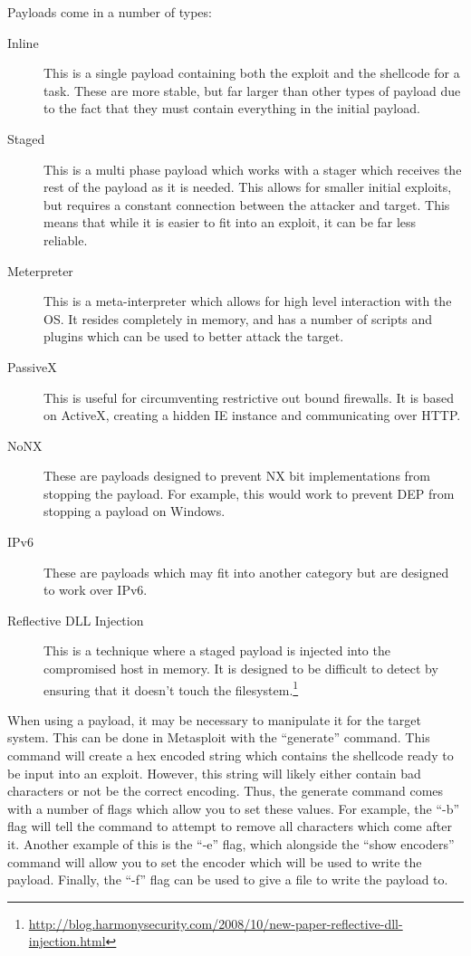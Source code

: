 \documentclass[a4paper,11pt]{report}
\begin{document}
				Payloads come in a number of types:
				\begin{description}
					\item[Inline]
						This is a single payload containing both the exploit and the shellcode for a task. 
						These are more stable, but far larger than other types of payload due to the fact that they must contain everything in the initial payload. 
					\item[Staged]
						This is a multi phase payload which works with a stager which receives the rest of the payload as it is needed. 
						This allows for smaller initial exploits, but requires a constant connection between the attacker and target. 
						This means that while it is easier to fit into an exploit, it can be far less reliable. 
					\item[Meterpreter]
						This is a meta-interpreter which allows for high level interaction with the OS. 
						It resides completely in memory, and has a number of scripts and plugins which can be used to better attack the target. 
					\item[PassiveX]
						This is useful for circumventing restrictive out bound firewalls. 
						It is based on ActiveX, creating a hidden IE instance and communicating over HTTP. 
					\item[NoNX]
						These are payloads designed to prevent NX bit implementations from stopping the payload. 
						For example, this would work to prevent DEP from stopping a payload on Windows. 
					\item[IPv6]
						These are payloads which may fit into another category but are designed to work over IPv6. 
					\item[Reflective DLL Injection]
						This is a technique where a staged payload is injected into the compromised host in memory. 
						It is designed to be difficult to detect by ensuring that it doesn't touch the filesystem.\footnote{\url{http://blog.harmonysecurity.com/2008/10/new-paper-reflective-dll-injection.html}}
				\end{description}
				
				When using a payload, it may be necessary to manipulate it for the target system. 
				This can be done in Metasploit with the ``generate'' command. 
				This command will create a hex encoded string which contains the shellcode ready to be input into an exploit. 
				However, this string will likely either contain bad characters or not be the correct encoding. 
				Thus, the generate command comes with a number of flags which allow you to set these values. 
				For example, the ``-b'' flag will tell the command to attempt to remove all characters which come after it. 
				Another example of this is the ``-e'' flag, which alongside the ``show encoders'' command will allow you to set the encoder which will be used to write the payload. 
				Finally, the ``-f'' flag can be used to give a file to write the payload to. 
		
\end{document}
